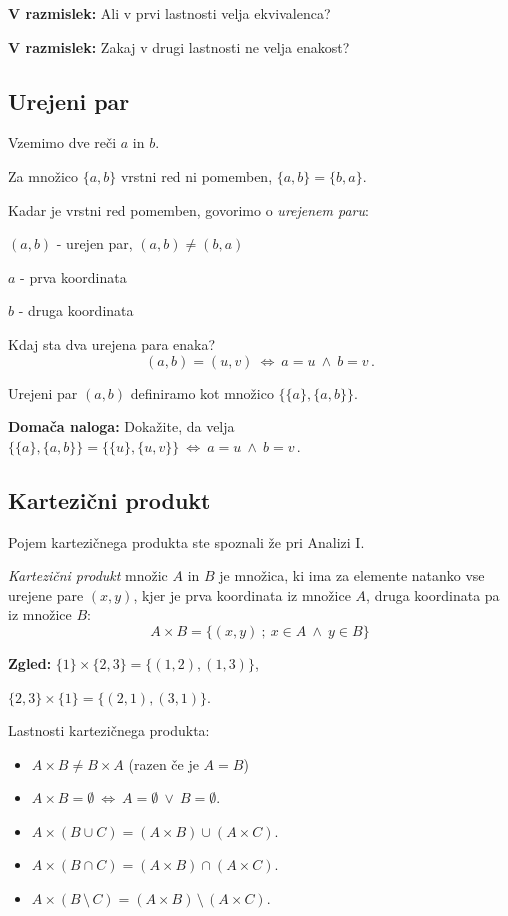 \documentclass[11pt,paper=b5,footinclude,headinclude]{scrbook} %
\def\ali {{~\vee~}}
\def\inn {{~\wedge~}}
\def\brez {{\,\setminus\,}}
\def\cee {{~\Leftrightarrow~}}
\begin{document}
\medskip
\textbf{ V razmislek:} Ali v prvi lastnosti velja ekvivalenca?

\medskip
\textbf{ V razmislek:} Zakaj v drugi lastnosti ne velja enakost?


\subsection{Urejeni par}

Vzemimo dve reči $a$ in $b$.

Za množico $\{a,b\}$ vrstni red ni pomemben, $\{a,b\} = \{b,a\}$.

Kadar je vrstni red pomemben, govorimo o {\em urejenem paru}:

$(a,b)$ - urejen par, $(a,b)\neq (b,a)$

$a$ - prva koordinata

$b$ - druga koordinata

Kdaj sta dva urejena para enaka?
$$(a,b) = (u,v) \cee a = u \inn b = v\,.$$

\medskip
Urejeni par $(a,b)$ definiramo kot množico $\{\{a\},\{a,b\}\}$.

\medskip
\textbf{ Domača naloga:}
Dokažite, da velja $\{\{a\},\{a,b\}\} = \{\{u\},\{u,v\}\}\cee a = u \inn b = v\,.$



\subsection{Kartezični produkt}

Pojem kartezičnega produkta ste spoznali že pri Analizi I.

{\em Kartezični produkt} množic $A$ in $B$ je množica, ki ima za elemente natanko vse urejene pare $(x,y)$, kjer je prva koordinata iz množice $A$, druga koordinata pa iz množice $B$:
$$A\times B = \{(x,y)~;~x\in A\inn y\in B\}$$



\textbf{ Zgled:} $\{1\}\times \{2,3\} = \{(1,2),(1,3)\}$,

$\{2,3\}\times \{1\} = \{(2,1),(3,1)\}$.

\bigskip
Lastnosti kartezičnega produkta:
\begin{itemize}
  \item $A\times B\neq B\times A$ (razen če je $A = B$)
  \item $A\times B = \emptyset \cee A= \emptyset \ali B = \emptyset$.
  \item $A\times (B\cup C) = (A\times B) \cup (A\times C)$.
  \item $A\times (B\cap C) = (A\times B) \cap (A\times C)$.
  \item $A\times (B\brez C) = (A\times B) \brez (A\times C)$.
\end{itemize}
\end{document}
